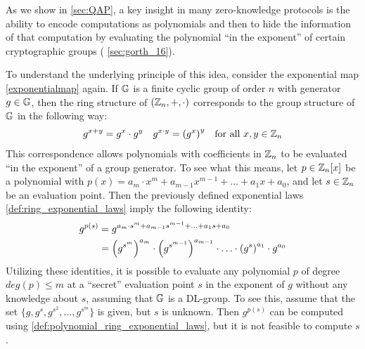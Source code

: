 \begin{example} As we show in \secname{} \ref{sec:QAP}, a key insight in many zero-knowledge protocols is the ability to encode computations as polynomials and then to hide the information of that computation by evaluating the polynomial ``in the exponent'' of certain cryptographic groups (\secname{} \ref{sec:gorth_16}).

To understand the underlying principle of this idea, consider the exponential map \eqref{exponentialmap} again. If $\mathbb{G}$ is a finite cyclic group of order $n$ with generator $g\in\mathbb{G}$, then the ring structure of $(\mathbb{Z}_n,+,\cdot)$ corresponds to the group structure of $\mathbb{G}$ in the following way:
\begin{align}
\label{def:ring_exponential_laws}
g^{x+y} &= g^x\cdot g^y & 
g^{x\cdot y} &= \left( g^x\right)^y & \text{for all } x,y\in\mathbb{Z}_n
\end{align}
This correspondence allows polynomials with coefficients in $\mathbb{Z}_n$ to be evaluated ``in the exponent'' of a group generator. To see what this means, let $p\in \mathbb{Z}_n[x]$ be a polynomial with $p(x)=a_m\cdot x^m+a_{m-1}x^{m-1}+\ldots + a_1x +a_0$, and let $s\in\mathbb{Z}_n$ be an evaluation point. Then the previously defined exponential laws \ref{def:ring_exponential_laws} imply the following identity:
\begin{align}
\label{def:polynomial_ring_exponential_laws}
g^{p(s)} & = g^{a_m\cdot s^m+a_{m-1}s^{m-1}+\ldots + a_1s +a_0}\\
         & = \left(g^{s^m}\right)^{a_m}\cdot \left(g^{s^{m-1}}\right)^{a_{m-1}}\cdot \ldots\cdot \left(g^{s}\right)^{a_1}\cdot g^{a_0}\notag
\end{align}
Utilizing these identities, it is possible to evaluate any polynomial $p$ of degree $deg(p)\leq m$ at a ``secret'' evaluation point $s$ in the exponent of $g$ without any knowledge about $s$, assuming that $\mathbb{G}$ is a DL-group. To see this, assume that the set $\{g,g^s, g^{s^2},\ldots, g^{s^m}\}$ is given, but $s$ is unknown. Then 
$g^{p(s)}$ can be computed using \eqref{def:polynomial_ring_exponential_laws}, but it is not feasible to compute $s$.   
\end{example}

